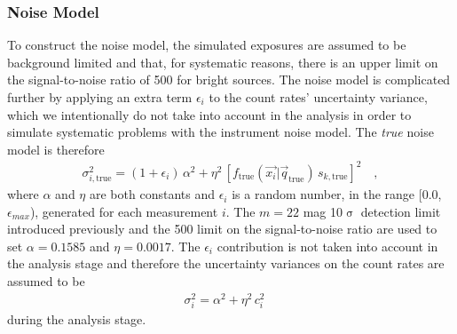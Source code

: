 \documentclass[manuscript]{aastex}
\newcommand{\true}{\text{true}}
\begin{document}
\subsubsection{Noise Model}
\label{sec:noise}
To construct the noise model, the simulated exposures are assumed to be background limited and that, for systematic reasons, there is an upper limit on the signal-to-noise ratio of 500 for bright sources. The noise model is complicated further by applying an extra term $\epsilon_i$ to the count rates' uncertainty variance, which we intentionally do not take into account in the analysis in order to simulate systematic problems with the instrument noise model. The \textit{true} noise model is therefore
\begin{eqnarray}
\sigma_{i, \true}^{2} = (1 + \epsilon_i) \, \alpha^{2} + \eta^{2}\, [ f_\true(\vec{x_i} | \vec{q}_\true) \, s_{k, \true} ]^2 \quad , \label{eqn:noise}
\end{eqnarray}
where $\alpha$ and $\eta$ are both constants and $\epsilon_i$ is a random number, in the range [0.0, $\epsilon_{max}$), generated for each measurement $i$. The $m = 22$ mag 10$\upsigma$ detection limit introduced previously and the 500 limit on the signal-to-noise ratio are used to set $\alpha = 0.1585$ and $\eta = 0.0017$. The $\epsilon_i$ contribution is not taken into account in the analysis stage and therefore the uncertainty variances on the count rates are assumed to be
\begin{eqnarray*}
\sigma_{{i}}^{2} = \alpha^{2} + \eta^{2} \, c^{2}_i \quad 
\end{eqnarray*}
during the analysis stage. 
\end{document}
